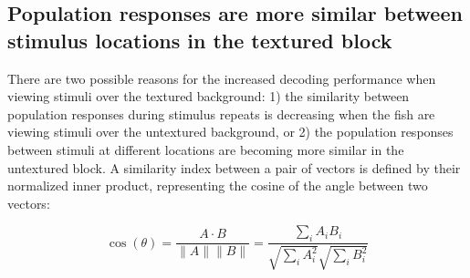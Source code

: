 \subsection{Population responses are more similar between stimulus locations in the textured block}
There are two possible reasons for the increased decoding performance when viewing stimuli over the textured background: 1) the similarity between population responses during stimulus repeats is decreasing when the fish are viewing stimuli over the untextured background, or 2) the population responses between stimuli at different locations are becoming more similar in the untextured block. A similarity index between a pair of vectors is defined by their normalized inner product, representing the cosine of the angle between two vectors:


\begin{equation}
    \cos(\theta) =  \frac{A\cdot B}{\|A\|\|B\|} = \frac{\sum_{i} A_{i} B_{i}}{\sqrt{\sum_{i}A_{i}^{2}} \sqrt{\sum_{i}B_{i}^{2}}}
\end{equation}


